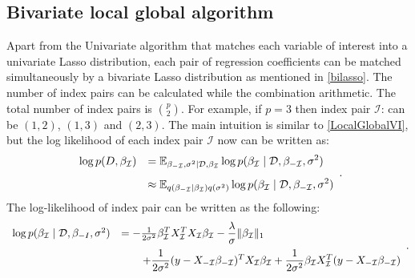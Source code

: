 \newpage
\subsection{Bivariate local global algorithm}
Apart from the Univariate algorithm that matches each variable of interest into a univariate Lasso distribution, each pair of regression coefficients can be matched simultaneously by a bivariate Lasso distribution as mentioned in \autoref{bilasso}.
The number of index pairs can be calculated while the combination arithmetic. The total number of index pairs is ${p}\choose{2}$. For example, if $p=3$ then index pair $\mathcal{I}$: can be $(1,2)$, $(1,3)$ and $(2,3)$.
The main intuition is similar to \autoref{LocalGlobalVI}, but
the log likelihood of each index pair $\mathcal{I}$ now can be written as:
\begin{equation}
	\begin{array}{rl} 
		\log p(D,\beta_{\mathcal I}) 
		& \displaystyle = \mathbb{E}_{\beta_{-{\mathcal I}},\sigma^2\mid \mathcal{D},\beta_{\mathcal I}} \log p(\beta_{\mathcal I}\mid \mathcal{D},\beta_{-{\mathcal I}},\sigma^2)
		\\ [2ex]
		& \displaystyle \approx  \mathbb{E}_{q(\beta_{-{\mathcal I}}\mid\beta_{\mathcal I})q(\sigma^2)} \log p(\beta_{\mathcal I}\mid \mathcal{D},\beta_{-{\mathcal I}},\sigma^2)\\
		
	\end{array}.
\end{equation}
The log-likelihood of index pair can be written as the following:
\begin{equation}
	\begin{array}{rl}
		\log p(\beta_{\mathcal I}\mid\mathcal{D},\beta_{-I},\sigma^2) 
		& \displaystyle = - \tfrac{1}{2\sigma^2}\beta_{\mathcal I}^TX_{\mathcal I}^TX_{\mathcal I}\beta_{\mathcal I} - \frac{\lambda}{\sigma} \|\beta_{{\mathcal I}} \|_1
		\\ [2ex]
		& \displaystyle \qquad 
		+ \frac{1}{2\sigma^2}(y - X_{-{\mathcal I}}\beta_{-{\mathcal I}})^TX_{\mathcal I}\beta_{{\mathcal I}}
		+ \frac{1}{2\sigma^2}\beta_{{\mathcal I}}X_{\mathcal I}^T(y - X_{-{\mathcal I}}\beta_{-{\mathcal I}})
		
	\end{array}.
\end{equation}


